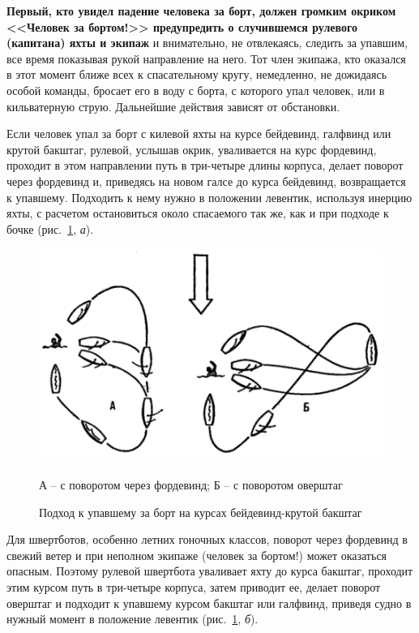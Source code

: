 \documentclass[a4paper, 12pt, twoside, final]{scrbook}
\begin{document}
\textbf{Первый, кто увидел падение человека за борт, должен громким окриком <<Человек за бортом!>> предупредить о случившемся рулевого (капитана) яхты и экипаж} и внимательно, не отвлекаясь, следить за упавшим, все время показывая рукой направление на него. Тот член экипажа, кто оказался в этот момент ближе всех к спасательному кругу, немедленно, не дожидаясь особой команды, бросает его в воду с борта, с которого упал человек, или в кильватерную струю. Дальнейшие действия зависят от обстановки.

Если человек упал за борт с килевой яхты на курсе бейдевинд, галфвинд или крутой бакштаг, рулевой, услышав окрик, уваливается на курс фордевинд, проходит в этом направлении путь в три\--четыре длины корпуса, делает поворот через фордевинд и, приведясь на новом галсе до курса бейдевинд, возвращается к упавшему. Подходить к нему нужно в положении левентик, используя инерцию яхты, с расчетом остановиться около спасаемого так же, как и при подходе к бочке (рис.~\ref{fig:134}, \textit{а}). 

\begin{figure}[htbp]
   \centering
   \includegraphics{134_Podhod_upavshemu_za_bort} %
   \caption{Подход к упавшему за борт на курсах бейдевинд\--крутой бакштаг}
   \label{fig:134}
   \centering\small
   А \--- с поворотом через фордевинд; Б \--- с поворотом оверштаг
\end{figure}

Для швертботов, особенно летних гоночных классов, поворот через фордевинд в свежий ветер и при неполном экипаже (человек за бортом!) может оказаться опасным. Поэтому рулевой швертбота уваливает яхту до курса бакштаг, проходит этим курсом путь в три-четыре корпуса, затем приводит ее, делает поворот оверштаг и подходит к упавшему курсом бакштаг или галфвинд, приведя судно в нужный момент в положение левентик (рис.~\ref{fig:134}, \textit{б}). 
\end{document}
